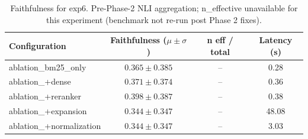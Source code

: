 \begin{table}[htbp]
\centering
\caption{Faithfulness for exp6. Pre-Phase-2 NLI aggregation; n\_effective unavailable for this experiment (benchmark not re-run post Phase 2 fixes).}
\label{tab:exp6-faithfulness-phase3}
\begin{tabular}{lccc}
\toprule
Configuration & Faithfulness ($\mu \pm \sigma$) & n eff / total & Latency (s) \\
\midrule
ablation\_bm25\_only & $0.365 \pm 0.385$ & -- & 0.28 \\
ablation\_+dense & $0.371 \pm 0.374$ & -- & 0.36 \\
ablation\_+reranker & $0.398 \pm 0.387$ & -- & 0.38 \\
ablation\_+expansion & $0.344 \pm 0.347$ & -- & 48.08 \\
ablation\_+normalization & $0.344 \pm 0.347$ & -- & 3.03 \\
\bottomrule
\end{tabular}
\end{table}
